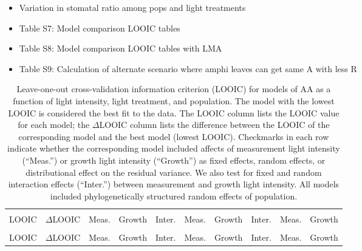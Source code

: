 \documentclass[
  letterpaper,
  DIV=11,
  numbers=noendperiod]{scrartcl}
\providecommand{\tightlist}{%
  \setlength{\itemsep}{0pt}\setlength{\parskip}{0pt}}\usepackage{longtable,booktabs,array}
\newcommand{\aax}{$\mathrm{AA}$}
\begin{document}
\begin{itemize}
\tightlist
\item
  Variation in stomatal ratio among pops and light treatments
\item
  Table S7: Model comparison LOOIC tables
\item
  Table S8: Model comparison LOOIC tables with LMA
\item
  Table S9: Calculation of alternate scenario where amphi leaves can get
  same A with less R
\end{itemize}

\begin{longtable}[t]{>{\centering\arraybackslash}p{0.7in}>{\centering\arraybackslash}p{0.5in}>{\centering\arraybackslash}p{0.4in}>{\centering\arraybackslash}p{0.4in}>{}c|>{\centering\arraybackslash}p{0.4in}>{\centering\arraybackslash}p{0.4in}>{}c|>{\centering\arraybackslash}p{0.4in}>{\centering\arraybackslash}p{0.4in}}

\caption{\label{tbl-aa_loo1}Leave-one-out cross-validation information
criterion (LOOIC) for models of \aax{} as a function of light intensity,
light treatment, and population. The model with the lowest LOOIC is
considered the best fit to the data. The LOOIC column lists the LOOIC
value for each model; the \(\Delta\)LOOIC column lists the difference
between the LOOIC of the corresponding model and the best model (lowest
LOOIC). Checkmarks in each row indicate whether the corresponding model
included affects of measurement light intensity (``Meas.'') or growth
light intensity (``Growth'') as fixed effects, random effects, or
distributional effect on the residual variance. We also test for fixed
and random interaction effects (``Inter.'') between measurement and
growth light intensity. All models included phylogenetically structured
random effects of population.}

\tabularnewline

\toprule
\multicolumn{2}{c}{ } & \multicolumn{3}{c}{Fixed} & \multicolumn{3}{c}{Random} & \multicolumn{2}{c}{Distributional} \\
\cmidrule(l{3pt}r{3pt}){3-5} \cmidrule(l{3pt}r{3pt}){6-8} \cmidrule(l{3pt}r{3pt}){9-10}
LOOIC & $\Delta$LOOIC & Meas. & Growth & Inter. & Meas. & Growth & Inter. & Meas. & Growth\\
\midrule
\endfirsthead
\multicolumn{10}{@{}l}{\textit{(continued)}}\\
\toprule
LOOIC & $\Delta$LOOIC & Meas. & Growth & Inter. & Meas. & Growth & Inter. & Meas. & Growth\\
\midrule
\endhead


\end{longtable}
\end{document}

